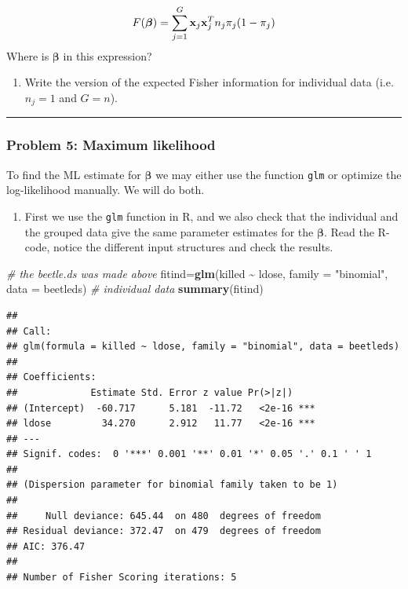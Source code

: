 \documentclass[
]{article}
\newenvironment{Shaded}{\begin{snugshade}}{\end{snugshade}}
\newcommand{\AttributeTok}[1]{\textcolor[rgb]{0.13,0.29,0.53}{#1}}
\newcommand{\CommentTok}[1]{\textcolor[rgb]{0.56,0.35,0.01}{\textit{#1}}}
\newcommand{\FunctionTok}[1]{\textcolor[rgb]{0.13,0.29,0.53}{\textbf{#1}}}
\newcommand{\NormalTok}[1]{#1}
\newcommand{\OtherTok}[1]{\textcolor[rgb]{0.56,0.35,0.01}{#1}}
\newcommand{\SpecialCharTok}[1]{\textcolor[rgb]{0.81,0.36,0.00}{\textbf{#1}}}
\newcommand{\StringTok}[1]{\textcolor[rgb]{0.31,0.60,0.02}{#1}}
\providecommand{\tightlist}{%
  \setlength{\itemsep}{0pt}\setlength{\parskip}{0pt}}
\begin{document}
\[F(\boldsymbol{\beta})=\sum_{j=1}^G {\bf x}_j {\bf x}_j^T n_j \pi_j (1-\pi_j)\]
Where is \(\boldsymbol{\beta}\) in this expression?

\begin{enumerate}
\def\labelenumi{\alph{enumi})}
\setcounter{enumi}{3}
\tightlist
\item
  Write the version of the expected Fisher information for individual
  data (i.e.~\(n_j=1\) and \(G=n\)).
\end{enumerate}

\begin{center}\rule{0.5\linewidth}{0.5pt}\end{center}

\hypertarget{problem-5-maximum-likelihood}{%
\subsubsection{Problem 5: Maximum
likelihood}\label{problem-5-maximum-likelihood}}

To find the ML estimate for \(\boldsymbol{\beta}\) we may either use the
function \texttt{glm} or optimize the log-likelihood manually. We will
do both.

\begin{enumerate}
\def\labelenumi{\alph{enumi})}
\tightlist
\item
  First we use the \texttt{glm} function in R, and we also check that
  the individual and the grouped data give the same parameter estimates
  for the \(\boldsymbol{\beta}\). Read the R-code, notice the different
  input structures and check the results.
\end{enumerate}

\begin{Shaded}
\begin{Highlighting}[]
\CommentTok{\# the beetle.ds was made above}
\NormalTok{fitind}\OtherTok{=}\FunctionTok{glm}\NormalTok{(killed }\SpecialCharTok{\textasciitilde{}}\NormalTok{ ldose, }\AttributeTok{family =} \StringTok{"binomial"}\NormalTok{, }\AttributeTok{data =}\NormalTok{ beetleds) }\CommentTok{\# individual data}
\FunctionTok{summary}\NormalTok{(fitind)}
\end{Highlighting}
\end{Shaded}

\begin{verbatim}
## 
## Call:
## glm(formula = killed ~ ldose, family = "binomial", data = beetleds)
## 
## Coefficients:
##             Estimate Std. Error z value Pr(>|z|)    
## (Intercept)  -60.717      5.181  -11.72   <2e-16 ***
## ldose         34.270      2.912   11.77   <2e-16 ***
## ---
## Signif. codes:  0 '***' 0.001 '**' 0.01 '*' 0.05 '.' 0.1 ' ' 1
## 
## (Dispersion parameter for binomial family taken to be 1)
## 
##     Null deviance: 645.44  on 480  degrees of freedom
## Residual deviance: 372.47  on 479  degrees of freedom
## AIC: 376.47
## 
## Number of Fisher Scoring iterations: 5
\end{verbatim}
\end{document}
